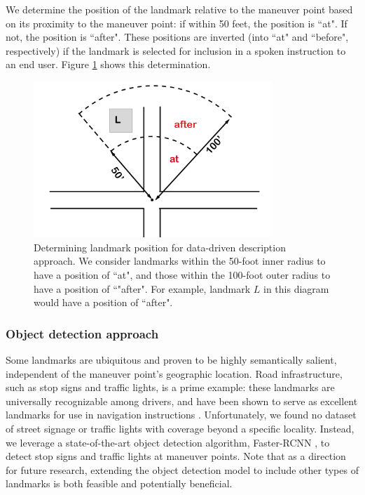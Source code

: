 We determine the position of the landmark relative to the maneuver point based on its proximity to the maneuver point: if within 50 feet, the position is ``at". If not, the position is ``after". These positions are inverted (into ``at" and ``before", respectively) if the landmark is selected for inclusion in a spoken instruction to an end user. Figure \ref{fig:positions} shows this determination.

\begin{figure}[htbp]
  \centering
  \includegraphics[width=0.8\textwidth]{images/positions.pdf}
  \caption{Determining landmark position for data-driven description approach. We consider landmarks within the 50-foot inner radius to have a position of ``at", and those within the 100-foot outer radius to have a position of ``"after". For example, landmark $L$ in this diagram would have a position of ``after".}
  \label{fig:positions}
\end{figure}

\subsubsection{Object detection approach}
Some landmarks are ubiquitous and proven to be highly semantically salient, independent of the maneuver point's geographic location. Road infrastructure, such as stop signs and traffic lights, is a prime example: these landmarks are universally recognizable among drivers, and have been shown to serve as excellent landmarks for use in navigation instructions \cite{may_ross_bayer_2005}. Unfortunately, we found no dataset of street signage or traffic lights with coverage beyond a specific locality. Instead, we leverage a state-of-the-art object detection algorithm, Faster-RCNN \cite{ren2015faster}, to detect stop signs and traffic lights at maneuver points. Note that as a direction for future research, extending the object detection model to include other types of landmarks is both feasible and potentially beneficial.

